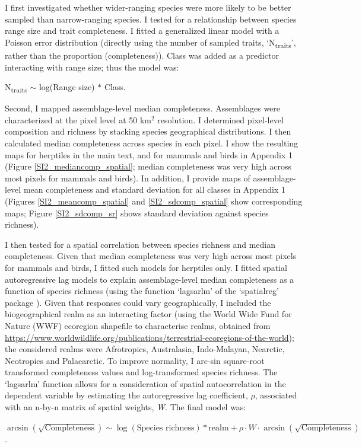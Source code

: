 I first investigated whether wider-ranging species were more likely to be better sampled than narrow-ranging species. I tested for a relationship between species range size and trait completeness. I fitted a generalized linear model with a Poisson error distribution (directly using the number of sampled traits, `N\textsubscript{traits}', rather than the proportion (completeness)). Class was added as a predictor interacting with range size; thus the model was:
\begin{center}
N\textsubscript{traits} $\sim$ log(Range size) $\ast$ Class. 
\end{center}
Second, I mapped assemblage-level median completeness. Assemblages were characterized at the pixel level at 50 km$^2$ resolution. I determined pixel-level composition and richness by stacking species geographical distributions. I then calculated median completeness across species in each pixel. I show the resulting maps for herptiles in the main text, and for mammals and birds in Appendix 1 (Figure \ref{SI2_mediancomp_spatial}; median completeness was very high across most pixels for mammals and birds). In addition, I provide maps of assemblage-level mean completeness and standard deviation for all classes in Appendix 1 (Figures \ref{SI2_meancomp_spatial} and \ref{SI2_sdcomp_spatial} show corresponding maps; Figure \ref{SI2_sdcomp_sr} shows standard deviation against species richness).

I then tested for a spatial correlation between species richness and median completeness. Given that median completeness was very high across most pixels for mammals and birds, I fitted such models for herptiles only. I fitted spatial autoregressive lag models to explain assemblage-level median completeness as a function of species richness (using the function `lagsarlm' of the `spatialreg' package \citep{spatialreg1, spatialreg2, spatialreg3}). Given that responses could vary geographically, I included the biogeographical realm as an interacting factor (using the World Wide Fund for Nature (WWF) ecoregion shapefile to characterise realms, obtained from \url{https://www.worldwildlife.org/publications/terrestrial-ecoregions-of-the-world}); the considered realms were Afrotropics, Australasia, Indo-Malayan, Nearctic, Neotropics and Palaearctic. To improve normality, I arc-sin square-root transformed completeness values and log-transformed species richness. The `lagsarlm' function allows for a consideration of spatial autocorrelation in the dependent variable by estimating the autoregressive lag coefficient, $\rho$, associated with an n-by-n matrix of spatial weights, \textit{W}. The final model was:
\begin{center}
$\arcsin(\sqrt{\text{Completeness}})\sim \log(\text{Species richness}) \ast \text{realm} + \rho \cdot W \cdot \arcsin(\sqrt{\text{Completeness}})$.\\
\end{center}

